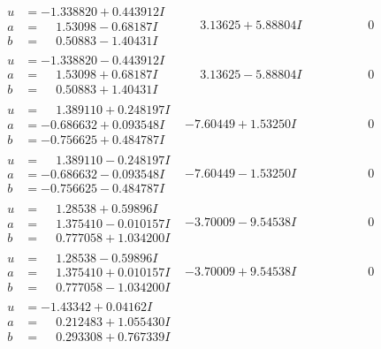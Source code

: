 \documentclass[1p]{elsarticle_modified}
\theoremstyle{definition}
\begin{document}
$$\begin{array}{c|c|c}
\begin{aligned}
u &= -1.338820 + 0.443912 I \\
a &= \phantom{-}1.53098 - 0.68187 I \\
b &= \phantom{-}0.50883 - 1.40431 I\end{aligned}
 & \phantom{-}3.13625 + 5.88804 I & \phantom{-0.000000 } 0 \\ \hline\begin{aligned}
u &= -1.338820 - 0.443912 I \\
a &= \phantom{-}1.53098 + 0.68187 I \\
b &= \phantom{-}0.50883 + 1.40431 I\end{aligned}
 & \phantom{-}3.13625 - 5.88804 I & \phantom{-0.000000 } 0 \\ \hline\begin{aligned}
u &= \phantom{-}1.389110 + 0.248197 I \\
a &= -0.686632 + 0.093548 I \\
b &= -0.756625 + 0.484787 I\end{aligned}
 & -7.60449 + 1.53250 I & \phantom{-0.000000 } 0 \\ \hline\begin{aligned}
u &= \phantom{-}1.389110 - 0.248197 I \\
a &= -0.686632 - 0.093548 I \\
b &= -0.756625 - 0.484787 I\end{aligned}
 & -7.60449 - 1.53250 I & \phantom{-0.000000 } 0 \\ \hline\begin{aligned}
u &= \phantom{-}1.28538 + 0.59896 I \\
a &= \phantom{-}1.375410 - 0.010157 I \\
b &= \phantom{-}0.777058 + 1.034200 I\end{aligned}
 & -3.70009 - 9.54538 I & \phantom{-0.000000 } 0 \\ \hline\begin{aligned}
u &= \phantom{-}1.28538 - 0.59896 I \\
a &= \phantom{-}1.375410 + 0.010157 I \\
b &= \phantom{-}0.777058 - 1.034200 I\end{aligned}
 & -3.70009 + 9.54538 I & \phantom{-0.000000 } 0 \\ \hline\begin{aligned}
u &= -1.43342 + 0.04162 I \\
a &= \phantom{-}0.212483 + 1.055430 I \\
b &= \phantom{-}0.293308 + 0.767339 I\end{aligned}

\end{array}$$
\end{document}
